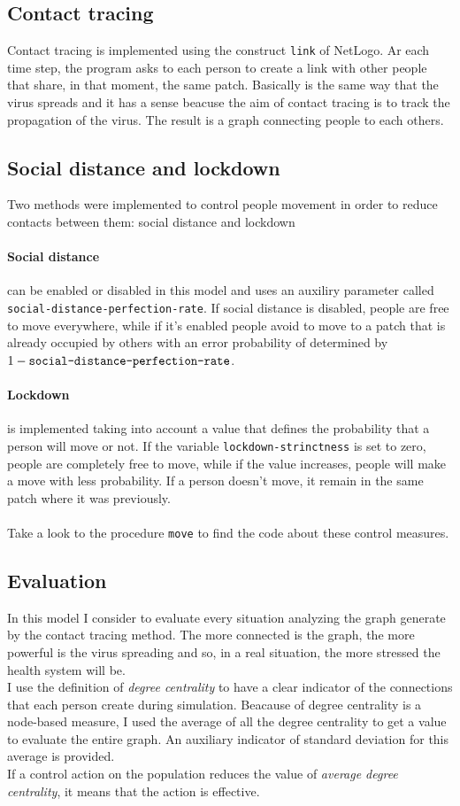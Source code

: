 \documentclass[12pt]{llncs}
\begin{document}
\subsection{Contact tracing}
Contact tracing is implemented using the construct \texttt{link} of NetLogo. Ar each time step, the program asks to each person to create a link with other people that share, in that moment, the same patch. Basically is the same way that the virus spreads and it has a sense beacuse the aim of contact tracing is to track the propagation of the virus. The result is a graph connecting people to each others.

\subsection{Social distance and lockdown}
Two methods were implemented to control people movement in order to reduce contacts between them: social distance and lockdown
\paragraph{Social distance} can be enabled or disabled in this model and uses an auxiliry parameter called \texttt{social-distance-perfection-rate}. If social distance is disabled, people are free to move everywhere, while if it's enabled people avoid to move to a patch that is already occupied by others with an error probability of determined by $1 - \textrm{\texttt{social-distance-perfection-rate}}$.
\paragraph{Lockdown} is implemented taking into account a value that defines the probability that a person will move or not. If the variable \texttt{lockdown-strinctness} is set to zero, people are completely free to move, while if the value increases, people will make a move with less probability. If a person doesn't move, it remain in the same patch where it was previously.\\ \\
Take a look to the procedure \texttt{move} to find the code about these control measures.


\subsection{Evaluation}
In this model I consider to evaluate every situation analyzing the graph generate by the contact tracing method. The more connected is the graph, the more powerful is the virus spreading and so, in a real situation, the more stressed the health system will be.\\
I use the definition of \textit{degree centrality} to have a clear indicator of the connections that each person create during simulation. Beacause of degree centrality is a node-based measure, I used the average of all the degree centrality to get a value to evaluate the entire graph. An auxiliary indicator of standard deviation for this average is provided. \\
If a control action on the population reduces the value of \textit{average degree centrality}, it means that the action is effective.
\end{document}
